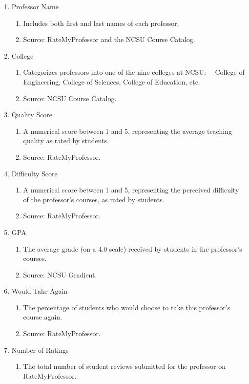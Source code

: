\documentclass[sigconf,nonacm]{acmart}
\begin{document}
\begin{enumerate}
\item Professor Name
\begin{enumerate}
    \item Includes both first and last names of each professor.
    \item Source: RateMyProfessor and the NCSU Course Catalog.
\end{enumerate}
\item College
\begin{enumerate}
    \item Categorizes professors into one of the nine colleges at NCSU:  
College of Engineering, College of Sciences, College of Education,
    etc.  
    \item Source: NCSU Course Catalog.
\end{enumerate}
\item Quality Score
\begin{enumerate}
    \item A numerical score between 1 and 5, representing the average teaching quality as rated by students. 
    \item Source: RateMyProfessor.
\end{enumerate}
\item Difficulty Score
\begin{enumerate}
    \item A numerical score between 1 and 5, representing the perceived difficulty of the professor’s courses, as rated by students.  
    \item Source: RateMyProfessor.
\end{enumerate}
\item GPA
\begin{enumerate}
    \item The average grade (on a 4.0 scale) received by students in the professor’s courses.  
    \item Source: NCSU Gradient.
\end{enumerate}
\item Would Take Again
\begin{enumerate}
    \item The percentage of students who would choose to take this professor’s course again. 
    \item Source: RateMyProfessor.
\end{enumerate}
\item Number of Ratings
\begin{enumerate}
    \item The total number of student reviews submitted for the professor on RateMyProfessor.  

\end{enumerate}
\end{enumerate}
\end{document}
